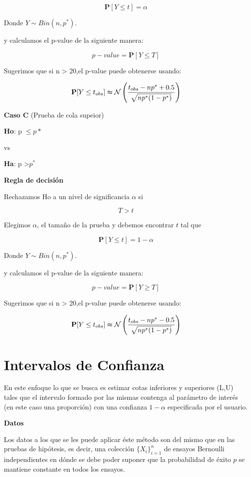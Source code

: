 \documentclass[a4paper,oneside,openany]{book}
\begin{document}
\[\mathbf{P}[Y \leq t]=\alpha\]

Donde \(Y \sim Bin (n,p^*)\).

y calculamos el p-value de la siguiente manera:

\[p-value= \mathbf{P}[Y\leq T]\]

Sugerimos que si n \textgreater{} 20,el p-value puede obtenerse usando:

\[\mathbf{P}[Y\leq t_{obs}] \thickapprox \mathcal{N} \left(\frac{t_{obs}-np^*+0.5}{\sqrt{np^*(1-p^*)}}\right)\]

\textbf{Caso C} (Prueba de cola supeior)

\textbf{Ho}: p \(\leq p*\)

vs

\textbf{Ha}: p \textgreater{}\(p^*\)

\textbf{Regla de decisión}

Rechazamos Ho a un nivel de significancia \(\alpha\) si

\[T > t\]

Elegimos \(\alpha\), el tamaño de la prueba y debemos encontrar \(t\)
tal que

\[\mathbf{P}[Y \leq t]=1-\alpha\]

Donde \(Y \sim Bin (n,p^*)\).

y calculamos el p-value de la siguiente manera:

\[p-value= \mathbf{P}[Y \geq T]\]

Sugerimos que si n \textgreater{} 20,el p-value puede obtenerse usando:

\[\mathbf{P}[Y\leq t_{obs}] \thickapprox \mathcal{N} \left(\frac{t_{obs}-np^*-0.5}{\sqrt{np^*(1-p^*)}}\right)\]

\section{Intervalos de Confianza}\label{intervalos-de-confianza}

En este enfoque lo que se busca es estimar cotas inferiores y superiores
(L,U) tales que el intervalo formado por las mismas contenga al
parámetro de interés (en este caso una proporción) con una confianza
\(1-\alpha\) especificada por el usuario.

\textbf{Datos}

Los datos a los que se les puede aplicar éste método son del mismo que
en las pruebas de hipótesis, es decir, una colección
\(\{X_{i}\}_{i=1}^n\) de ensayos Bernoulli independientes en dónde se
debe poder suponer que la probabilidad de éxito \(p\) se mantiene
constante en todos los ensayos.
\end{document}
